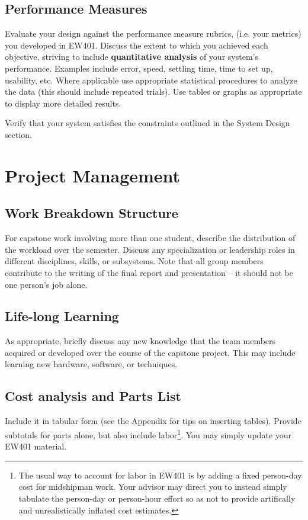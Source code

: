 \documentclass{wrcecapstone}
\begin{document}
\subsection{Performance Measures}
Evaluate your design against the performance measure rubrics, (i.e. your metrics) you developed in EW401. Discuss the extent to which you achieved each objective, striving to include \textbf{quantitative analysis} of your system’s performance. Examples include error, speed, settling time, time to set up, usability, etc. Where applicable use appropriate statistical procedures to analyze the data (this should include repeated trials). Use tables or graphs as appropriate to display more detailed results.  

Verify that your system satisfies the constraints outlined in the System Design section.




\section{Project Management}

\subsection{Work Breakdown Structure}
For capstone work involving more than one student, describe the distribution of the workload over the semester. Discuss any specialization or leadership roles in different disciplines, skills, or subsystems. Note that all group members contribute to the writing of the final report and presentation – it should not be one person’s job alone.  

\subsection{Life-long Learning}
As appropriate, briefly discuss any new knowledge that the team members acquired or developed over the course of the capstone project. This may include learning new hardware, software, or techniques.

\subsection{Cost analysis and Parts List}
Include it in tabular form (see the Appendix for tips on inserting tables).  Provide subtotals for parts alone, but also include labor\footnote{The usual way to account for labor in EW401 is by adding a fixed person-day cost for midshipman work. Your advisor may direct you to instead simply tabulate the person-day or person-hour effort so as not to provide artifically and unrealistically inflated cost estimates.}.  You may simply update your EW401 material.
\end{document}
